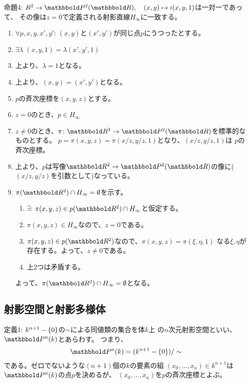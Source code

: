 \begin{framed}
  命題4:
  $R^2 \to \P^2(\R),\quad (x,y)\mapsto i(x,y,1)$は一対一であって、
  その像は$z=0$で定義される射影直線$H_\infty$に一致する。
\end{framed}
\begin{myproof}
  \begin{enumerate}
    \item $\forall p,x,y,x',y'$: $(x,y)$と$(x',y')$が同じ点$p$にうつったとする。
    \item
    $\exists \lambda$ $(x,y,1) = \lambda(x',y',1)$
    \item
    上より、$\lambda = 1$となる。
    \item
    上より、$(x,y)=(x',y')$となる。
    \item
    $p$の斉次座標を$(x,y,z)$とする。
    \item
    $z=0$のとき、$p\in H_\infty$
    \item
    $z\neq 0$のとき、$\pi\colon \R^3 \to \P^2(\R)$を標準的なものとする。
    $p=\pi(x,y,z) = \pi(x/z,y/z,1)$となり、$(x/z,y/z,1)$は
    $p$の斉次座標。
    \item
    上より、$p$は写像$\R^2 \to \P^2(\R)$の像に($(x/z,y/z)$を引数として)なっている。
    \item
    $\pi(\R^2)\cap H_\infty = \emptyset$を示す。
    \begin{enumerate}
      \item $\exists$: $\pi(x,y,z) \in p(\R^2)\cap H_\infty$と仮定する。
      \item
      $\pi(x,y,z) \in H_\infty$なので、$z=0$である。
      \item
      $\pi(x,y,z) \in p(\R^2)$なので、$\pi(x,y,z) = \pi(\xi,\eta,1)$
      なる$\xi,\eta$が存在する。よって、$z\neq 0$である。
      \item
      上2つは矛盾する。
    \end{enumerate}
    よって、$\pi(\R^2)\cap H_\infty = \emptyset$となる。
  \end{enumerate}
\end{myproof}

\subsection{射影空間と射影多様体}
\label{sub:射影空間と射影多様体}
\begin{framed}
  定義1:
  $k^{n+1}-\{0\}$の$\sim$による同値類の集合を体$k$上
  の$n$次元射影空間といい、$\P^n(k)$とあらわす。
  つまり、
  \begin{align}
    \P^n(k) = (k^{n+1}-\zeroset)/\sim
  \end{align}
  である。ゼロでないような$(n+1)$個の$k$の要素の組
  $(x_0,\dots,x_n)\in k^{n+1}$は$\P^n(k)$の点$p$を決めるが、
  $(x_0,\dots,x_n)$を$p$の斉次座標とよぶ。
\end{framed}

